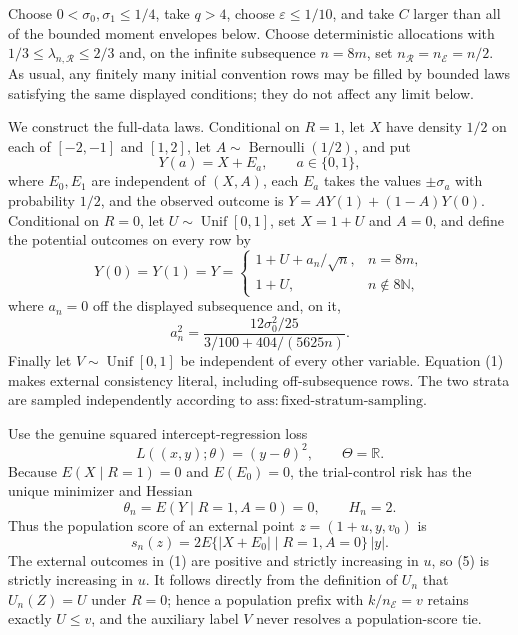 Choose \(0<\sigma _0,\sigma _1\leq 1/4\), take \(q>4\), choose \(\varepsilon\leq 1/10\), and take \(C\) larger than all of the bounded moment envelopes below.  Choose deterministic allocations with \(1/3\leq\lambda_{n,\mathcal R}\leq2/3\) and, on the infinite subsequence \(n=8m\), set \(n_{\mathcal R}=n_{\mathcal E}=n/2\).  As usual, any finitely many initial convention rows may be filled by bounded laws satisfying the same displayed conditions; they do not affect any limit below.

We construct the full-data laws.  Conditional on \(R=1\), let \(X\) have density \(1/2\) on each of \([-2,-1]\) and \([1,2]\), let \(A\sim\operatorname{Bernoulli}(1/2)\), and put
\[
 Y(a)=X+E_a,\qquad a\in\{0,1\},
\]
where \(E_0,E_1\) are independent of \((X,A)\), each \(E_a\) takes the values \(\pm\sigma_a\) with probability \(1/2\), and the observed outcome is \(Y=AY(1)+(1-A)Y(0)\).  Conditional on \(R=0\), let \(U\sim\operatorname{Unif}[0,1]\), set \(X=1+U\) and \(A=0\), and define the potential outcomes on every row by
\[
 Y(0)=Y(1)=Y=
 \begin{cases}
  1+U+a_n/\sqrt n,&n=8m,\\
  1+U,&n\notin8\mathbb N,
 \end{cases}
 \tag{1}
\]
where \(a_n=0\) off the displayed subsequence and, on it,
\[
 a_n^2=
 \frac{12\sigma_0^2/25}{3/100+404/(5625n)}.
 \tag{2}
\]
Finally let \(V\sim\operatorname{Unif}[0,1]\) be independent of every other variable.  Equation (1) makes external consistency literal, including off-subsequence rows.  The two strata are sampled independently according to \(\mathrm{ass:fixed\text{-}stratum\text{-}sampling}\).

Use the genuine squared intercept-regression loss
\[
 L((x,y);\theta)=(y-\theta)^2,
 \qquad \Theta=\mathbb R.
 \tag{3}
\]
Because \(E(X\mid R=1)=0\) and \(E(E_0)=0\), the trial-control risk has the unique minimizer and Hessian
\[
 \theta_n=E(Y\mid R=1,A=0)=0,
 \qquad H_n=2.
 \tag{4}
\]
Thus the population score of an external point \(z=(1+u,y,v_0)\) is
\[
 s_n(z)
 =2E\{|X+E_0|\mid R=1,A=0\}\,|y|.
 \tag{5}
\]
The external outcomes in (1) are positive and strictly increasing in \(u\), so (5) is strictly increasing in \(u\).  It follows directly from the definition of \(U_n\) that \(U_n(Z)=U\) under \(R=0\); hence a population prefix with \(k/n_{\mathcal E}=v\) retains exactly \(U\leq v\), and the auxiliary label \(V\) never resolves a population-score tie.


